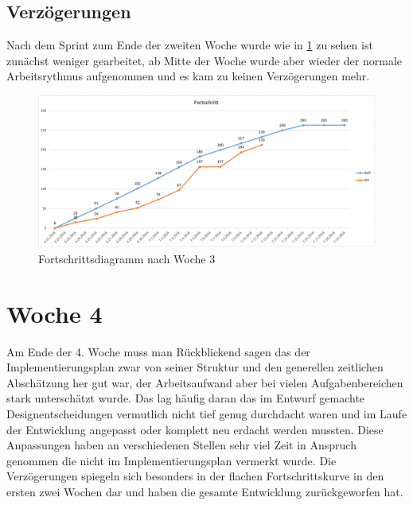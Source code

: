 \subsection{Verzögerungen}
Nach dem Sprint zum Ende der zweiten Woche wurde wie in \ref{fig:week_three_diagram} zu sehen ist zunächst weniger gearbeitet, ab Mitte der Woche wurde aber wieder der normale Arbeitsrythmus aufgenommen und es kam zu keinen Verzögerungen mehr.
\begin{figure}[!htbp]
	\centering
	\includegraphics[width=380pt]{resourcen/week_three_diagram.PNG}
	\caption{Fortschrittsdiagramm nach Woche 3}
	\label{fig:week_three_diagram}
\end{figure}
\section{Woche 4}
Am Ende der 4. Woche muss man Rückblickend sagen das der Implementierungsplan zwar von seiner Struktur und den generellen zeitlichen Abschätzung her gut war, der Arbeitsaufwand aber bei vielen Aufgabenbereichen stark unterschätzt wurde. Das lag häufig daran das im Entwurf gemachte Designentscheidungen vermutlich nicht tief genug durchdacht waren und im Laufe der Entwicklung angepasst oder komplett neu erdacht werden mussten. Diese Anpassungen haben an verschiedenen Stellen sehr viel Zeit in Anspruch genommen die nicht im Implementierungsplan vermerkt wurde. Die Verzögerungen spiegeln sich besonders in der flachen Fortschrittskurve in den ersten zwei Wochen dar und haben die gesamte Entwicklung zurückgeworfen hat.
